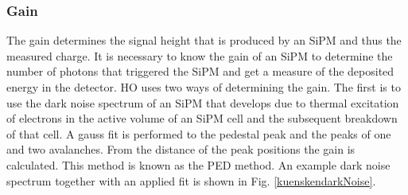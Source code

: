 \subsubsection{Gain}
The gain determines the signal height that is produced by an SiPM and thus the measured charge. It is necessary to know the gain of an SiPM to determine the number of photons that triggered the SiPM and get a measure of the deposited energy in the detector. HO uses two ways of determining the gain.
The first is to use the dark noise spectrum of an SiPM that develops due to thermal excitation of electrons in the active volume of an SiPM cell and the subsequent breakdown of that cell. A gauss fit is performed to the pedestal peak and the peaks of one and two avalanches. From the distance of the peak positions the gain is calculated. This method is known as the PED method. An example dark noise spectrum together with an applied fit is shown in Fig. \ref{kuenskendarkNoise}.
